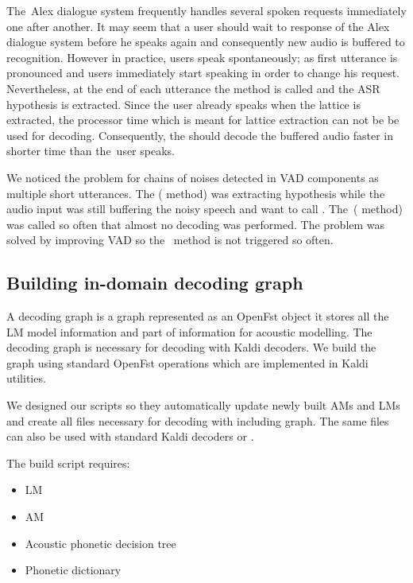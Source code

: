 The~Alex dialogue system frequently handles several spoken requests immediately one after another.
It may seem that a user should wait to response of the Alex dialogue system before he speaks again and consequently new audio is buffered to recognition.
However in practice, users speak spontaneously; as first utterance is pronounced and users immediately start speaking in order to change his request.
Nevertheless, at the end of each utterance the  method is called and the ASR hypothesis is extracted.
Since the user already speaks when the lattice is extracted, the processor time which is meant for lattice extraction can not be be used for decoding.
Consequently, the  should decode the buffered audio faster in shorter time than the~user speaks.

We noticed the problem for chains of noises detected in \ac{VAD} components as multiple short utterances.
The ( method) was extracting hypothesis while the audio input was still buffering the noisy speech and want to call .
The~( method) was called so often that almost no decoding was performed.
The problem was solved by improving \ac{VAD} so the~ method is not triggered so often.

\subsection{Building in-domain decoding graph}
\label{sub:hclg}
A decoding graph is a graph represented as an OpenFst object it stores all the \ac{LM} model information and part of information for acoustic modelling. 
The decoding graph is necessary for decoding with Kaldi decoders.
We build the  graph using standard OpenFst operations which are implemented in Kaldi utilities. 

We designed our scripts so they automatically update newly built \acp{AM} and \acp{LM} and create all files necessary for decoding with  including  graph.
The same files can also be used with standard Kaldi decoders or .

The  build script requires:
\begin{itemize}
    \item \acl{LM}
    \item \acl{AM}
    \item Acoustic phonetic decision tree
    \item Phonetic dictionary
\end{itemize}

